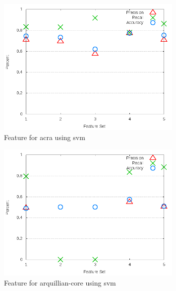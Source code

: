 \begin{figure}
\centering
\includegraphics[width=0.8\textwidth]{images/svm/test_3/acra_sample_range.png}
\caption{Feature for acra using \gls{svm}}
\label{fig:test_3_acra_svm}
\end{figure}

\begin{figure}
\centering
\includegraphics[width=0.8\textwidth]{images/svm/test_3/arquillian-core_sample_range.png}
\caption{Feature for arquillian-core using \gls{svm}}
\label{fig:test_3_arquillian-core_svm}
\end{figure}

\clearpage

